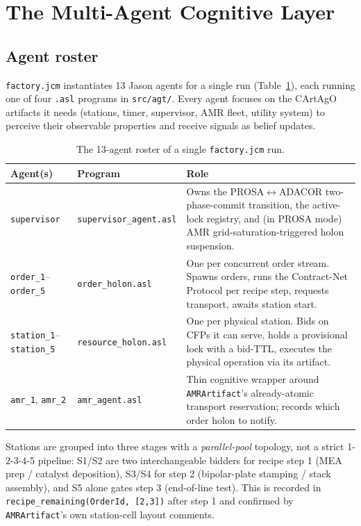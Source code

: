\documentclass[twocolumn,10pt,a4paper]{article}
\newcommand{\code}[1]{\texttt{\small #1}}
\newcommand{\file}[1]{\texttt{#1}}
\begin{document}
\section{The Multi-Agent Cognitive Layer}
\label{ch:mas}

\subsection{Agent roster}
\file{factory.jcm} instantiates 13 Jason agents for a single run (Table~\ref{tab:agents}), each running one of four \code{.asl} programs in \file{src/agt/}. Every agent focuses on the CArtAgO artifacts it needs (stations, timer, supervisor, AMR fleet, utility system) to perceive their observable properties and receive signals as belief updates.

\begin{table}[t]
\centering
\small
\begin{tabular}{@{}lp{2.6cm}p{11.5cm}@{}}
\toprule
\textbf{Agent(s)} & \textbf{Program} & \textbf{Role} \\
\midrule
\code{supervisor} & \code{supervisor\_agent.asl} & Owns the PROSA$\leftrightarrow$ADACOR two-phase-commit transition, the active-lock registry, and (in PROSA mode) AMR grid-saturation-triggered holon suspension. \\
\code{order\_1}--\code{order\_5} & \code{order\_holon.asl} & One per concurrent order stream. Spawns orders, runs the Contract-Net Protocol per recipe step, requests transport, awaits station start. \\
\code{station\_1}--\code{station\_5} & \code{resource\_holon.asl} & One per physical station. Bids on CFPs it can serve, holds a provisional lock with a bid-TTL, executes the physical operation via its artifact. \\
\code{amr\_1}, \code{amr\_2} & \code{amr\_agent.asl} & Thin cognitive wrapper around \code{AMRArtifact}'s already-atomic transport reservation; records which order holon to notify. \\
\bottomrule
\end{tabular}
\caption{The 13-agent roster of a single \code{factory.jcm} run.}
\label{tab:agents}
\end{table}

Stations are grouped into three stages with a \emph{parallel-pool} topology, not a strict 1-2-3-4-5 pipeline: S1/S2 are two interchangeable bidders for recipe step 1 (MEA prep / catalyst deposition), S3/S4 for step 2 (bipolar-plate stamping / stack assembly), and S5 alone gates step 3 (end-of-line test). This is recorded in \code{recipe\_remaining(OrderId, [2,3])} after step 1 and confirmed by \code{AMRArtifact}'s own station-cell layout comments.
\end{document}
